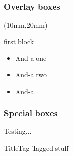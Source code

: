 \documentclass[mathserif, fleqn]{beamer}
\begin{document}
\begin{frame}\frametitle{Overlay boxes}
  \begin{textblock*}{60mm} (10mm,20mm)
    \begin{itembox}{first block}
      \begin{itemize}
      \item And-a one
      \item And-a two
      \item And-a
      \end{itemize}
    \end{itembox}
  \end{textblock*}


\end{frame}

\begin{frame}\frametitle{Special boxes}
  \begin{fancybox}{Testing...}
    \lipsum[2]
  \end{fancybox}

  \begin{tagbox}{Title}{Tag}%
    Tagged stuff
  \end{tagbox}
\end{frame}
\end{document}
